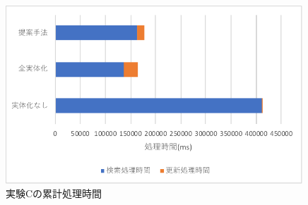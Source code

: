 \documentclass[a4paper,11pt]{ujreport}
\begin{document}
\begin{figure}[htbp]
	\begin{center}
		\includegraphics[width=30em]{src/ExperimentC-total.pdf} %
	\end{center}
	\caption{実験Cの累計処理時間}
	\label{figure:ExperimentC-total}
\end{figure}
\end{document}
